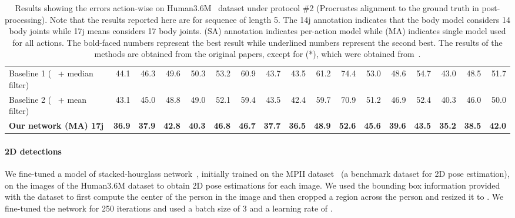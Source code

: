 \documentclass[runningheads]{llncs}
\begin{document}
\begin{table*}
{\begin{tabular}{@{}lrrrrrrrrrrrrrrrr@{}}
\hline
Baseline 1 (~\cite{JMartinez:ICCV:2017} + median filter)  & 44.1& 	46.3& 	49.6& 	50.3& 	53.2& 	60.9& 	43.7& 	43.5& 	61.2& 	74.4& 	53.0& 	48.6& 	54.7& 	43.0& 	48.5& 	51.7\\
Baseline 2 (~\cite{JMartinez:ICCV:2017} + mean filter)  & 43.1 &  45.0& 48.8 &	49.0& 52.1 &	59.4&	43.5&	42.4&	59.7&	70.9& 51.2 & 46.9 &	52.4& 40.3 &	46.0& 50.0 \\ 
\textbf{Our network (MA) 17j} & \bf{36.9}&  \bf{37.9}&	\bf{42.8}&	\bf{40.3}&	\bf{46.8}&	\bf{46.7}&	\bf{37.7}&	\bf{36.5}&	\bf{48.9}&	\bf{52.6}&	\bf{45.6}&	\bf{39.6}&	\bf{43.5}&	\bf{35.2}&	\bf{38.5}&	\bf{42.0}\\
\hline
\end{tabular}
}
\vspace{3mm}
\caption{Results showing the errors action-wise on Human3.6M~\cite{h36m_pami} dataset under protocol \#2 (Procrustes alignment to the ground truth in post-processing). Note that the results reported here are for sequence of length 5. The 14j  annotation indicates that the body model considers 14  body joints while 17j means considers 17 body joints. (SA) annotation indicates per-action model while (MA) indicates single model used for all actions. The bold-faced numbers represent the best result while underlined numbers represent the second best. The results of the methods are obtained from the original
papers, except for (*), which were obtained from~\cite{bogo2016keep}.}
\vspace{-5mm}
\label{tab:protocol_2}
\end{table*}


\paragraph{2D detections} 
We fine-tuned a model of stacked-hourglass network~\cite{stacked-hourglass}, initially trained on the MPII dataset~\cite{mpii} (a benchmark dataset for 2D pose estimation), on the images of the Human3.6M dataset to obtain 2D pose estimations for each image. We used the bounding box information provided with the dataset to first compute the center of the person in the image and then cropped a  region across the person and resized it to . We fine-tuned the network for 250 iterations and used a batch size of 3 and a learning rate of .
\end{document}
